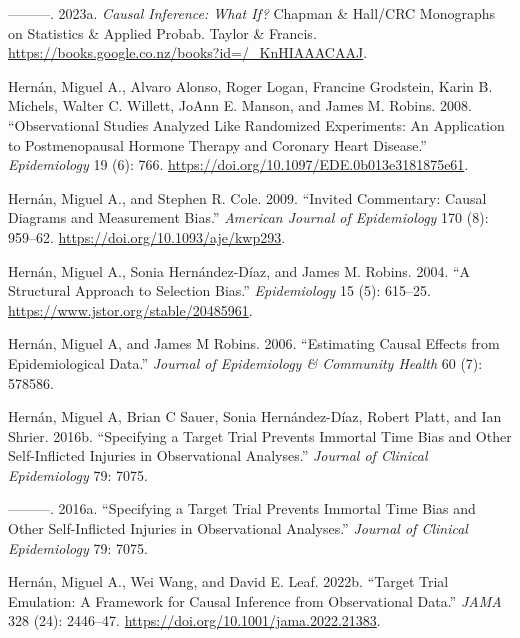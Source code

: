 \documentclass[
  singlecolumn]{report}
\newlength{\cslhangindent}
\newlength{\cslentryspacingunit} %
\newenvironment{CSLReferences}[2] %
 {%
  \setlength{\parindent}{0pt}
  \ifodd #1
  \let\oldpar\par
  \def\par{\hangindent=\cslhangindent\oldpar}
  \fi
  \setlength{\parskip}{#2\cslentryspacingunit}
 }%
 {}
\begin{document}
\begin{CSLReferences}{1}{0}
\leavevmode{}%
---------. 2023a. \emph{Causal Inference: What If?} Chapman \& Hall/CRC
Monographs on Statistics \& Applied Probab. Taylor \& Francis.
\url{https://books.google.co.nz/books?id=/_KnHIAAACAAJ}.

\leavevmode{}%
Hernán, Miguel A., Alvaro Alonso, Roger Logan, Francine Grodstein, Karin
B. Michels, Walter C. Willett, JoAnn E. Manson, and James M. Robins.
2008. {``Observational Studies Analyzed Like Randomized Experiments: An
Application to Postmenopausal Hormone Therapy and Coronary Heart
Disease.''} \emph{Epidemiology} 19 (6): 766.
\url{https://doi.org/10.1097/EDE.0b013e3181875e61}.

\leavevmode{}%
Hernán, Miguel A., and Stephen R. Cole. 2009. {``Invited Commentary:
Causal Diagrams and Measurement Bias.''} \emph{American Journal of
Epidemiology} 170 (8): 959--62.
\url{https://doi.org/10.1093/aje/kwp293}.

\leavevmode{}%
Hernán, Miguel A., Sonia Hernández-Díaz, and James M. Robins. 2004. {``A
Structural Approach to Selection Bias.''} \emph{Epidemiology} 15 (5):
615--25. \url{https://www.jstor.org/stable/20485961}.

\leavevmode{}%
Hernán, Miguel A, and James M Robins. 2006. {``Estimating Causal Effects
from Epidemiological Data.''} \emph{Journal of Epidemiology \& Community
Health} 60 (7): 578586.

\leavevmode{}%
Hernán, Miguel A, Brian C Sauer, Sonia Hernández-Díaz, Robert Platt, and
Ian Shrier. 2016b. {``Specifying a Target Trial Prevents Immortal Time
Bias and Other Self-Inflicted Injuries in Observational Analyses.''}
\emph{Journal of Clinical Epidemiology} 79: 7075.

\leavevmode{}%
---------. 2016a. {``Specifying a Target Trial Prevents Immortal Time
Bias and Other Self-Inflicted Injuries in Observational Analyses.''}
\emph{Journal of Clinical Epidemiology} 79: 7075.

\leavevmode{}%
Hernán, Miguel A., Wei Wang, and David E. Leaf. 2022b. {``Target Trial
Emulation: A Framework for Causal Inference from Observational Data.''}
\emph{JAMA} 328 (24): 2446--47.
\url{https://doi.org/10.1001/jama.2022.21383}.


\end{CSLReferences}
\end{document}
